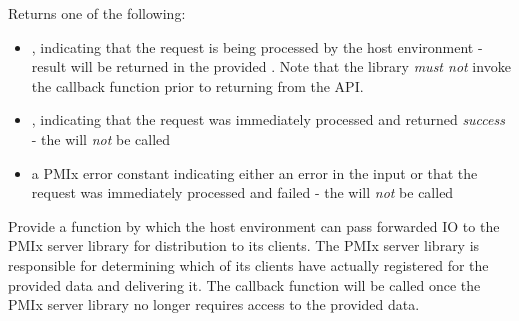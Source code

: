 \begin{arglist}
\end{arglist}

Returns one of the following:

\begin{itemize}
    \item {}, indicating that the request is being processed by the host environment - result will be returned in the provided . Note that the library \emph{must not} invoke the callback function prior to returning from the \ac{API}.
    \item {}, indicating that the request was immediately processed and returned \textit{success} - the  will \textit{not} be called
    \item a PMIx error constant indicating either an error in the input or that the request was immediately processed and failed - the  will \textit{not} be called
\end{itemize}

\descr

Provide a function by which the host environment can pass forwarded \ac{IO} to the \ac{PMIx} server library for distribution to its clients. The \ac{PMIx} server library is responsible for determining which of its clients have actually registered for the provided data and delivering it. The  callback function will be called once the \ac{PMIx} server library no longer requires access to the provided data.

\subsection{}

\summary

